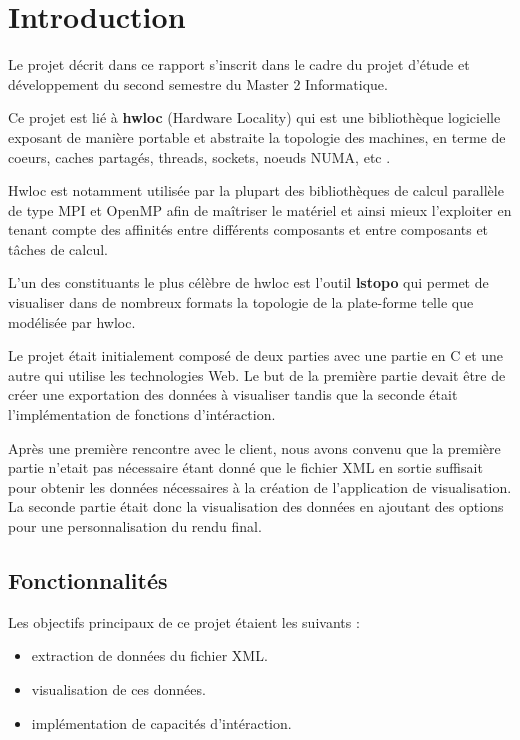 \documentclass [a4paper,11pt]{article}
\begin{document}
\section{Introduction}
Le projet décrit dans ce rapport s'inscrit dans le cadre du projet d'étude et développement du second semestre du Master 2 Informatique.
\newline

Ce projet est lié à \textbf{hwloc} (Hardware Locality) qui est une bibliothèque logicielle exposant de manière portable et abstraite la topologie des machines, en terme de coeurs, caches partagés, threads, sockets, noeuds NUMA, etc \cite{lstopo}.
\newline

Hwloc est notamment utilisée par la plupart des bibliothèques de calcul parallèle de type MPI et OpenMP afin de maîtriser le matériel et ainsi mieux l'exploiter en tenant compte des affinités entre différents composants et entre composants et tâches de calcul.
\newline

L'un des constituants le plus célèbre de hwloc est l'outil \textbf{lstopo} qui permet de visualiser dans de nombreux formats la topologie de la plate-forme telle que modélisée par hwloc.
\newline

Le projet était initialement composé de deux parties avec une partie en C et une autre qui utilise les technologies Web. Le but de la première partie devait être de créer une exportation des données à visualiser tandis que la seconde était l'implémentation de fonctions d'intéraction. 
\newline

Après une première rencontre avec le client, nous avons convenu que la première partie n'etait pas nécessaire étant donné que le fichier XML en sortie suffisait pour obtenir les données nécessaires à la création de l'application de visualisation. La seconde partie était donc la visualisation des données en ajoutant des options pour une personnalisation du rendu final.

\newpage

\subsection{Fonctionnalités}

Les objectifs principaux de ce projet étaient les suivants : \newline

\begin{itemize}
\item extraction de données du fichier XML.
\item visualisation de ces données.
\item implémentation de capacités d'intéraction.
\end{itemize}
\end{document}
